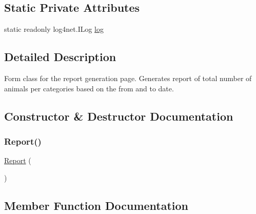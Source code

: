 \subsection*{Static Private Attributes}
\begin{DoxyCompactItemize}
\item 
static readonly log4net.\+I\+Log \hyperlink{classWildlifeTrackingApp_1_1Report_ae6c6142b8525b2f4ac6ee6e003b3106f}{log}
\end{DoxyCompactItemize}


\subsection{Detailed Description}
Form class for the report generation page. Generates report of total number of animals per categories based on the from and to date. 



\subsection{Constructor \& Destructor Documentation}
\mbox{\label{classWildlifeTrackingApp_1_1Report_a62bc0d20ce17d1ee1289cfccd4c0ce68}} 
\subsubsection{\texorpdfstring{Report()}{Report()}}
{\footnotesize\ttfamily \hyperlink{classWildlifeTrackingApp_1_1Report}{Report} (\begin{DoxyParamCaption}{ }\end{DoxyParamCaption})\hspace{0.3cm}{\ttfamily [inline]}}



\subsection{Member Function Documentation}
\mbox{\label{classWildlifeTrackingApp_1_1Report_a849c3c7f8d08104f0cdb46bee9fe6389}} 
